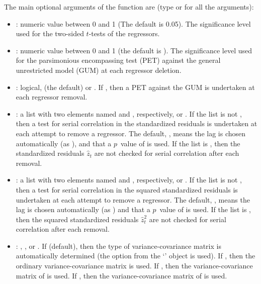 \documentclass[article,nojss]{jss}
\begin{document}
The main optional arguments of the  function are (type  or  for all the arguments):
%
\begin{itemize}
\item {}: numeric value between 0 and 1 (The default is
  0.05). The significance level used for the two-sided $t$-tests of
  the regressors.
	
\item {}: numeric value between 0 and 1 (the default is
  ). The significance level used for the parsimonious
  encompassing test (PET) against the general unrestricted model (GUM)
  at each regressor deletion.
	
\item{}: logical,  (the default) or
  . If , then a PET against the GUM is
  undertaken at each regressor removal.
	
\item {}: a list with two elements named  and
  , respectively, or . If the list is not
  , then a \cite{Ljungetal79} test for serial correlation
  in the standardized residuals is undertaken at each attempt to
  remove a regressor. The default, , means the lag is chosen automatically (as ), and that a $p$~value of  is used. If the
  list is , then the standardized residuals $\widehat{z}_t$
  are not checked for serial correlation after each removal.
	
\item {}: a list with two elements named 
  and , respectively, or . If the list is not
  , then a \cite{Ljungetal79} test for serial correlation
  in the squared standardized residuals is undertaken at each attempt
  to remove a regressor. The default, , means the lag is chosen automatically (as ) and that a $p$~value of  is used. If the
  list is , then the squared standardized residuals
  $\widehat{z}_t^2$ are not checked for serial correlation after each
  removal.
	
\item {}: , , 
  or . If  (default), then the type of
  variance-covariance matrix is automatically determined (the option
  from the `' object is used). If , then the
  ordinary variance-covariance matrix is used. If , then
  the variance-covariance matrix of \cite{White80} is used. If
  , then the variance-covariance matrix of
  \cite{Neweyetal87} is used.
	

\end{itemize}
\end{document}
